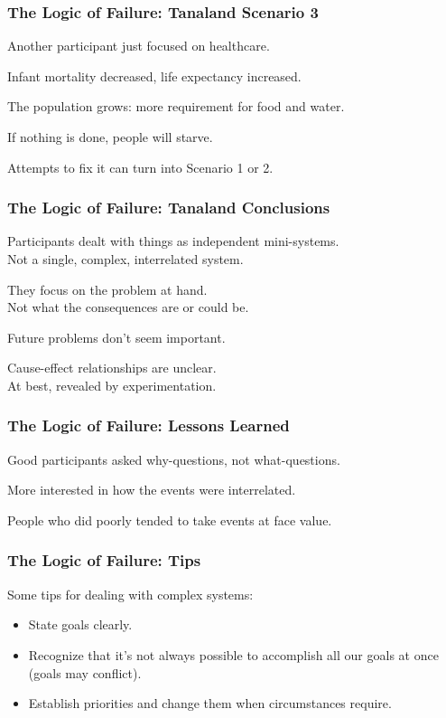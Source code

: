 \begin{frame}
\frametitle{The Logic of Failure: Tanaland Scenario 3}
\begin{changemargin}{1cm}
Another participant just focused on healthcare.

Infant mortality decreased, life expectancy increased.

The population grows: more requirement for food and water.

If nothing is done, people will starve.

Attempts to fix it can turn into Scenario 1 or 2.

\end{changemargin}
\end{frame}

\begin{frame}
\frametitle{The Logic of Failure: Tanaland Conclusions}
\begin{changemargin}{1cm}
Participants dealt with things as independent mini-systems.\\
\quad Not a single, complex, interrelated system. 

They focus on the problem at hand. \\
\quad Not what the consequences are or could be. 

Future problems don't seem important.

Cause-effect relationships are unclear.\\
\quad At best, revealed by experimentation.

\end{changemargin}
\end{frame}


\begin{frame}
\frametitle{The Logic of Failure: Lessons Learned}
\begin{changemargin}{1cm}
Good participants asked why-questions, not what-questions.

More interested in how the events were interrelated.

People who did poorly tended to take events at face value.

\end{changemargin}
\end{frame}


\begin{frame}
\frametitle{The Logic of Failure: Tips}
\begin{changemargin}{1cm}
 Some tips for dealing with complex systems:
 
\begin{itemize}
	\item State goals clearly.
	\item Recognize that it's not always possible to accomplish all our goals at once (goals may conflict).
	\item Establish priorities and change them when circumstances require.
\end{itemize}

\end{changemargin}
\end{frame}


